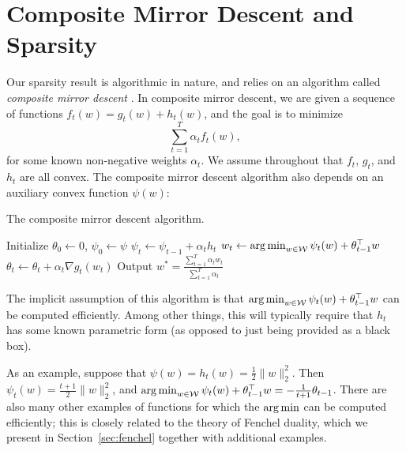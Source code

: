 \documentclass[paper.tex]{subfiles}
\begin{document}
\section{Composite Mirror Descent and Sparsity}
\label{sec:algorithm}

Our sparsity result is algorithmic in nature, and relies on an algorithm called 
\emph{composite mirror descent} \cite{comid}. In composite mirror descent, we 
are given a sequence of functions $f_t(w) = g_t(w) + h_t(w)$, and the goal is to 
minimize
\[ \sum_{t=1}^T \alpha_t f_t(w), \]
for some known non-negative weights $\alpha_t$. We assume throughout that $f_t$, 
$g_t$, and $h_t$ are all convex. The composite mirror descent algorithm also 
depends on an auxiliary convex function $\psi(w)$:
\begin{algorithm}
\caption{The composite mirror descent algorithm.}
\label{alg:comid}
\begin{algorithmic}
\STATE Initialize $\theta_0 \gets 0$, $\psi_0 \gets \psi$
  \STATE $\psi_t \gets \psi_{t-1} + \alpha_t h_t$
  \STATE $w_t \gets \argmin_{w \in \W} \psi_{t}(w) + \theta_{t-1}^{\top} w$
  \STATE $\theta_t \gets \theta_t + \alpha_t \nabla g_t(w_t)$
\ENDFOR
\STATE Output $w^* = \frac{\sum_{t=1}^T \alpha_t w_t}{\sum_{t=1}^T \alpha_t}$
\end{algorithmic}
\end{algorithm}

The implicit assumption of this algorithm is that 
$\argmin_{w \in \W} \psi_t(w) + \theta_{t-1}^{\top}w$ can be computed efficiently. 
Among other things, this will typically require that $h_t$ has some known parametric 
form (as opposed to just being provided as a black box).

As an example, suppose that $\psi(w) = h_t(w) = \frac{1}{2}\|w\|_2^2$. Then 
$\psi_t(w) = \frac{t+1}{2}\|w\|_2^2$, and 
$\argmin_{w \in \W} \psi_t(w) + \theta_{t-1}^{\top} w = -\frac{1}{t+1}\theta_{t-1}$.
There are also many other examples of functions for which the $\argmin$ can be 
computed efficiently; this is closely related to the theory of Fenchel duality, 
which we present in Section~\ref{sec:fenchel} together with additional examples.
\end{document}
